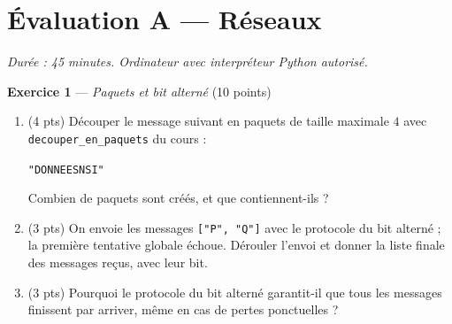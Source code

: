 \section*{Évaluation A --- Réseaux}
\textit{Durée : 45 minutes. Ordinateur avec interpréteur Python autorisé.}


\bigskip

\textbf{Exercice 1} --- \textit{Paquets et bit alterné} \hfill (10 points)

\begin{enumerate}
  \item (4 pts) Découper le message suivant en paquets de taille maximale $4$ avec
  \lstinline{decouper_en_paquets} du cours :
  \begin{center}\lstinline{"DONNEESNSI"}\end{center}
  Combien de paquets sont créés, et que contiennent-ils ?
  \item (3 pts) On envoie les messages \lstinline{["P", "Q"]} avec le protocole du bit alterné ; la première tentative globale échoue. Dérouler l'envoi et donner la liste finale des messages reçus, avec leur bit.
  \item (3 pts) Pourquoi le protocole du bit alterné garantit-il que tous les messages finissent par arriver, même en cas de pertes ponctuelles ?
\end{enumerate}



